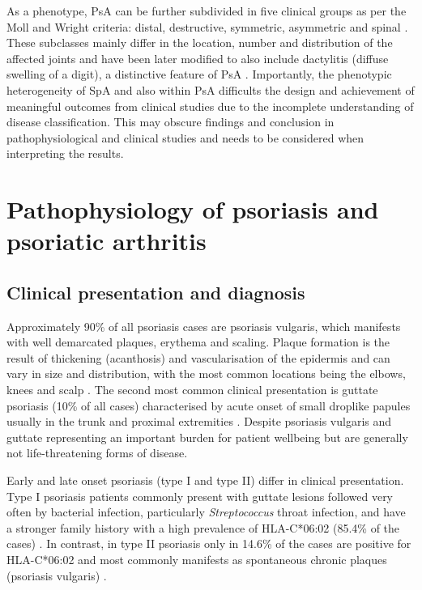 As a phenotype, PsA can be further subdivided in five clinical groups as per the Moll and Wright criteria: distal, destructive, symmetric, asymmetric and spinal \parencite{Moll1973}. These subclasses mainly differ in the location, number and distribution of the affected joints and have been later modified to also include dactylitis (diffuse swelling of a digit), a distinctive feature of PsA \parencite{Reich2012}. Importantly, the phenotypic heterogeneity of SpA and also within PsA difficults the design and achievement of meaningful outcomes from clinical studies due to the incomplete understanding of disease classification. This may obscure findings and conclusion in pathophysiological and clinical studies and needs to be considered when interpreting the results.



\section{Pathophysiology of psoriasis and psoriatic arthritis}

\subsection{Clinical presentation and diagnosis}
%
Approximately 90\% of all psoriasis cases are psoriasis vulgaris, which manifests with well demarcated plaques, erythema and scaling. Plaque formation is the result of thickening (acanthosis) and vascularisation of the epidermis and can vary in size and distribution, with the most common locations being the elbows, knees and scalp \parencite{Perera2012,Griffiths2007}. The second most common clinical presentation is guttate psoriasis  (10\% of all cases) characterised by acute onset of small droplike papules usually in the trunk and proximal extremities \parencite{Vence2015}. Despite psoriasis vulgaris and guttate representing an important burden for patient wellbeing but are generally not life-threatening forms of disease. 

Early and late onset psoriasis (type I and type II) differ in clinical presentation. Type I psoriasis patients commonly present with guttate lesions followed very often by bacterial infection, particularly \textit{Streptococcus} throat infection, and have a stronger family history with a high prevalence of HLA-C*06:02 (85.4\% of the cases) \parencite{Telfer1992}. In contrast, in type II psoriasis only in 14.6\% of the cases are positive for HLA-C*06:02 and most commonly manifests as spontaneous chronic plaques (psoriasis vulgaris) \parencite{Perera2012}. 


